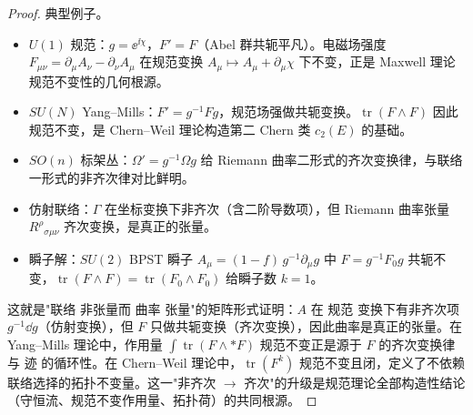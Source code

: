 \begin{proof}
典型例子。
\begin{itemize}
\item $U(1)$ 规范：$g=\ee^{\ii\chi}$，$F'=F$（Abel 群共轭平凡）。电磁场强度 $F_{\mu\nu}=\partial_\mu A_\nu-\partial_\nu A_\mu$ 在规范变换 $A_\mu\mapsto A_\mu+\partial_\mu\chi$ 下不变，正是 Maxwell 理论规范不变性的几何根源。
\item $SU(N)$ Yang--Mills：$F'=g^{-1}Fg$，规范场强做共轭变换。$\operatorname{tr}(F\wedge F)$ 因此规范不变，是 Chern--Weil 理论构造第二 Chern 类 $c_2(E)$ 的基础。
\item $SO(n)$ 标架丛：$\Omega'=g^{-1}\Omega g$ 给 Riemann 曲率二形式的齐次变换律，与联络一形式的非齐次律对比鲜明。
\item 仿射联络：$\Gamma$ 在坐标变换下非齐次（含二阶导数项），但 Riemann 曲率张量 $R^\rho{}_{\sigma\mu\nu}$ 齐次变换，是真正的张量。
\item 瞬子解：$SU(2)$ BPST 瞬子 $A_\mu=(1-f)\,g^{-1}\partial_\mu g$ 中 $F=g^{-1}F_0g$ 共轭不变，$\operatorname{tr}(F\wedge F)=\operatorname{tr}(F_0\wedge F_0)$ 给瞬子数 $k=1$。
\end{itemize}

这就是"联络 非张量而 曲率 张量"的矩阵形式证明：$A$ 在 规范 变换下有非齐次项 $g^{-1}\dd g$（仿射变换），但 $F$ 只做共轭变换（齐次变换），因此曲率是真正的张量。在 Yang--Mills 理论中，作用量 $\int\operatorname{tr}(F\wedge *F)$ 规范不变正是源于 $F$ 的齐次变换律与 迹 的循环性。在 Chern--Weil 理论中，$\operatorname{tr}(F^k)$ 规范不变且闭，定义了不依赖联络选择的拓扑不变量。这一"非齐次 $\to$ 齐次"的升级是规范理论全部构造性结论（守恒流、规范不变作用量、拓扑荷）的共同根源。
\end{proof}

